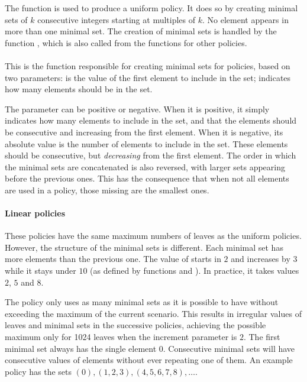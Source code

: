 \documentclass{article}
\begin{document}
The function  is used to produce a uniform policy. It does so by creating minimal sets of $k$ consecutive integers starting at multiples of $k$. No element appears in more than one minimal set. The creation of minimal sets is handled by the function , which is also called from the functions for other policies.

\paragraph{}
This is the function responsible for creating minimal sets for policies, based on two parameters:  is the value of the first element to include in the set;  indicates how many elements should be in the set.

The parameter  can be positive or negative. When it is positive, it simply indicates how many elements to include in the set, and that the elements should be consecutive and increasing from the first element. When it is negative, its absolute value is the number of elements to include in the set. These elements should be consecutive, but \emph{decreasing} from the first element. The order in which the minimal sets are concatenated is also reversed, with larger sets appearing before the previous ones. This has the consequence that when not all elements are used in a policy, those missing are the smallest ones.

\paragraph{Linear policies}
These policies have the same maximum numbers of leaves as the uniform policies. However, the structure of the minimal sets is different. Each minimal set has  more elements than the previous one. The value of  starts in $2$ and increases by $3$ while it stays under $10$ (as defined by functions  and ). In practice, it takes values $2$, $5$ and $8$. 

The policy only uses as many minimal sets as it is possible to have without exceeding the maximum of the current scenario. This results in irregular values of leaves and minimal sets in the successive policies, achieving the possible maximum only for 1024 leaves when the increment parameter is $2$. The first minimal set always has the single element $0$. Consecutive minimal sets will have consecutive values of elements without ever repeating one of them. An example policy has the sets $(0), (1,2,3), (4,5,6,7,8), \ldots$.
\end{document}
